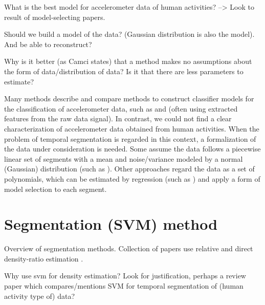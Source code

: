 What is the best model for accelerometer data of human activities? --> Look to result of model-selecting papers.

Should we build a model of the data? (Gaussian distribution is also the model). And be able to reconstruct?

Why is it better (as Camci states) that a method makes no assumptions about the form of data/distribution of data? Is it that there are less parameters to estimate?

Many methods describe and compare methods to construct classifier models for the classification of accelerometer data, such as \cite{kwapisz2011activity} and \cite{zhang2011optimal} (often using extracted features from the raw data signal).
In contrast, we could not find a clear characterization of accelerometer data obtained from human activities.
When the problem of temporal segmentation is regarded in this context, a formalization of the data under consideration is needed.
Some assume the data follows a piecewise linear set of segments with a mean and noise/variance modeled by a normal (Gaussian) distribution (such as \cite{camci2010change}).
Other approaches regard the data as a set of polynomials, which can be estimated by regression (such as \cite{chamroukhi2013joint}) and apply a form of model selection to each segment.


\section{Segmentation (SVM) method}
Overview of segmentation methods.
Collection of papers use relative and direct density-ratio estimation \cite{kawahara2009change, liu2013change}.

Why use \gls{svm} for density estimation? Look for justification, perhaps a review paper which compares/mentions SVM for temporal segmentation of (human activity type of) data?

